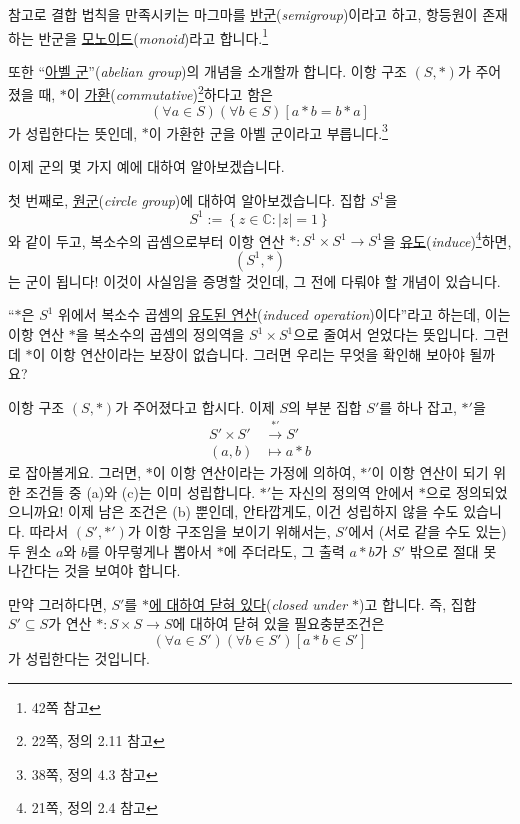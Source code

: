 \documentclass[12pt]{paper}
\begin{document}
  참고로 결합 법칙을 만족시키는 마그마를 \underline{반군}(\textit{semigroup})이라고 하고,
  항등원이 존재하는 반군을 \underline{모노이드}(\textit{monoid})라고 합니다.\footnote{\cite{fraleigh2009} 42쪽 참고}

  또한 ``\underline{아벨 군}''(\textit{abelian group})의 개념을 소개할까 합니다.
  이항 구조 $\left( S , * \right)$가 주어졌을 때,
  $*$이 \underline{가환}(\textit{commutative})\footnote{\cite{fraleigh2009} 22쪽, 정의 2.11 참고}하다고 함은
  \begin{equation*}
    \left( \forall a \in S \right) \left( \forall b \in S \right) \left[ a * b = b * a \right] \tag{4}
  \end{equation*}
  가 성립한다는 뜻인데,
  $*$이 가환한 군을 아벨 군이라고 부릅니다.\footnote{\cite{fraleigh2009} 38쪽, 정의 4.3 참고}

  이제 군의 몇 가지 예에 대하여 알아보겠습니다.

  첫 번째로, \underline{원군}(\textit{circle group})에 대하여 알아보겠습니다.
  집합 $S^1$을
  \begin{equation*}
    S^1 := \left\{ z \in \mathbb{C} : \left| z \right| = 1 \right\} \tag{5}
  \end{equation*}
  와 같이 두고,
  복소수의 곱셈으로부터 이항 연산 $* : S^1 \times S^1 \to S^1$을 \underline{유도}(\textit{induce})\footnote{\cite{fraleigh2009} 21쪽, 정의 2.4 참고}하면,
  $$\left( S^1 , * \right)$$는 군이 됩니다!
  이것이 사실임을 증명할 것인데, 그 전에 다뤄야 할 개념이 있습니다.

  ``$*$은 $S^1$ 위에서 복소수 곱셈의 \underline{유도된 연산}(\textit{induced operation})이다''라고 하는데,
  이는 이항 연산 $*$을 복소수의 곱셈의 정의역을 $S^1 \times S^1$으로 줄여서 얻었다는 뜻입니다.
  그런데 $*$이 이항 연산이라는 보장이 없습니다.
  그러면 우리는 무엇을 확인해 보아야 될까요?

  이항 구조 $\left( S , * \right)$가 주어졌다고 합시다.
  이제 $S$의 부분 집합 $S'$를 하나 잡고, $*'$을
  \begin{align*}
    S' \times S' & \xrightarrow{*'} S' \\
    \left( a , b \right) & \mapsto a * b
  \end{align*}
  로 잡아볼게요.
  그러면, $*$이 이항 연산이라는 가정에 의하여,
  $*'$이 이항 연산이 되기 위한 조건들 중 (a)와 (c)는 이미 성립합니다.
  $*'$는 자신의 정의역 안에서 $*$으로 정의되었으니까요!
  이제 남은 조건은 (b) 뿐인데, 안타깝게도, 이건 성립하지 않을 수도 있습니다.
  따라서 $\left( S' , *' \right)$가 이항 구조임을 보이기 위해서는,
  $S'$에서 (서로 같을 수도 있는) 두 원소 $a$와 $b$를 아무렇게나 뽑아서 $*$에 주더라도,
  그 출력 $a * b$가 $S'$ 밖으로 절대 못 나간다는 것을 보여야 합니다.

  만약 그러하다면, $S'$를 \underline{$*$에 대하여 닫혀 있다}(\textit{closed under $*$})고 합니다.
  즉, 집합 $S' \subseteq S$가 연산 $* : S \times S \to S$에 대하여 닫혀 있을 필요충분조건은
  $$ \left( \forall a \in S' \right) \left( \forall b \in S' \right) \left[ a * b \in S' \right] $$
  가 성립한다는 것입니다.

  

  
\end{document}
